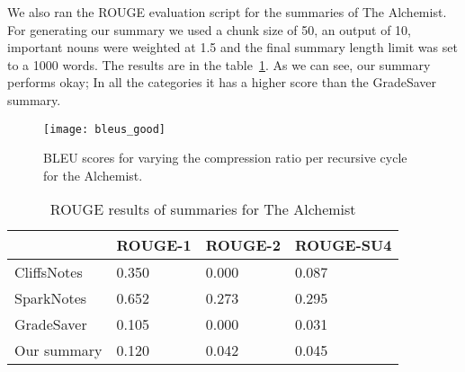We also ran the ROUGE evaluation script for the summaries of The Alchemist. For
generating our summary we used a chunk size of 50, an output of 10, important
nouns were weighted at 1.5 and the final summary length limit was set to a 1000
words. The results are in the table~\ref{tab:rouge-alchemist}. As we can see,
our summary performs okay; In all the categories it has a higher score than the
GradeSaver summary.

\begin{figure}[H]
	\centering
	\texttt{[image: bleus\_good]}
	\caption{BLEU scores for varying the compression ratio per recursive cycle for the Alchemist.}\label{fig:bleus}
\end{figure}

\begin{table}[H]
	\centering
	\caption{ROUGE results of summaries for The Alchemist}\label{tab:rouge-alchemist}
	\begin{tabular}{l l l l}
		\toprule
		\textbf{}   & \textbf{ROUGE-1} & \textbf{ROUGE-2} & \textbf{ROUGE-SU4} \\ \midrule
		CliffsNotes & 0.350           & 0.000           & 0.087 \\ \midrule
		SparkNotes  & 0.652           & 0.273           & 0.295 \\ \midrule
		GradeSaver  & 0.105           & 0.000           & 0.031 \\ \midrule
		Our summary & 0.120           & 0.042           & 0.045 \\
		\bottomrule
	\end{tabular}
\end{table}

